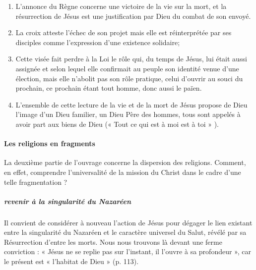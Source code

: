\begin{enumerate}

    \item  L’annonce du Règne concerne une victoire de la vie sur la mort, et la résurrection de Jésus est une justification par Dieu du combat de son envoyé. 
    \item   La croix atteste l’échec de son projet mais elle est réinterprétée par ses disciples comme l’expression d’une existence solidaire; 
    \item Cette visée fait perdre à la Loi le rôle qui, du temps de Jésus, lui était aussi assignée et selon lequel elle confirmait au peuple son identité venue d’une élection, mais elle n’abolit pas son rôle pratique, celui d’ouvrir au souci du prochain, ce prochain étant tout homme, donc aussi le païen.  
    \item   L’ensemble de cette lecture de la vie et de la mort de Jésus propose de Dieu l’image d’un Dieu familier, un Dieu Père des hommes, tous sont appelés à avoir part aux biens de Dieu (« Tout ce qui est à moi est à toi » ).  

\end{enumerate}

\paragraph{Les religions en fragments}
 La deuxième partie de l’ouvrage concerne la dispersion des religions. Comment, en effet, comprendre l’universalité de la mission du Christ dans le cadre d’une telle fragmentation ?
 
\subparagraph{revenir à la singularité du Nazaréen}
 Il convient de considérer à nouveau l’action de Jésus pour dégager le lien existant entre la singularité du Nazaréen et le caractère universel du Salut, révélé par sa Résurrection d’entre les morts.  Nous nous trouvons là devant une ferme conviction : « Jésus ne se replie pas sur l’instant, il l’ouvre à sa profondeur », car le présent est « l’habitat de Dieu » (p. 113). 

